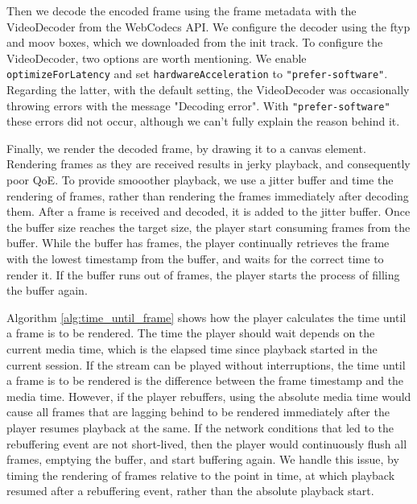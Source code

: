 Then we decode the encoded frame using the frame metadata with the VideoDecoder from the WebCodecs API. We configure the decoder using the ftyp and moov boxes, which we downloaded from the init track.  To configure the VideoDecoder, two options are worth mentioning. We enable \lstinline{optimizeForLatency} %
and set \lstinline{hardwareAcceleration} to \lstinline{"prefer-software"}. Regarding the latter, with the default setting, the VideoDecoder was occasionally throwing errors with the message "Decoding error". With \lstinline{"prefer-software"} these errors did not occur, although we can't fully explain the reason behind it. %

Finally, we render the decoded frame, by drawing it to a canvas element. Rendering frames as they are received results in jerky playback, and consequently poor \ac{QoE}. To provide smooother playback, we use a jitter buffer and time the rendering of frames, rather than rendering the frames immediately after decoding them. After a frame is received and decoded, it is added to the jitter buffer. Once the buffer size reaches the target size, the player start consuming frames from the buffer. While the buffer has frames, the player continually retrieves the frame with the lowest timestamp from the buffer, and waits for the correct time to render it. If the buffer runs out of frames, the player starts the process of filling the buffer again.

Algorithm \ref{alg:time_until_frame} shows how the player calculates the time until a frame is to be rendered. The time the player should wait depends on the current media time, which is the elapsed time since playback started in the current session. If the stream can be played without interruptions, the time until a frame is to be rendered is the difference between the frame timestamp and the media time. However, if the player rebuffers, using the absolute media time would cause all frames that are lagging behind to be rendered immediately after the player resumes playback at the same. If the network conditions that led to the rebuffering event are not short-lived, then the player would continuously flush all frames, emptying the buffer, and start buffering again. We handle this issue, by timing the rendering of frames relative to the point in time, at which playback resumed after a rebuffering event, rather than the absolute playback start.  %

